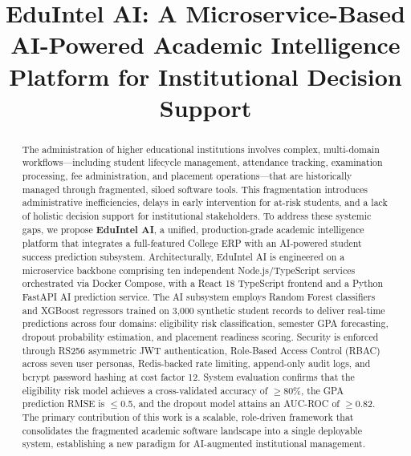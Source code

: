 \documentclass[conference]{IEEEtran}
\begin{document}
\title{EduIntel AI: A Microservice-Based AI-Powered Academic Intelligence Platform for Institutional Decision Support}

\author{
\and
{}
}

\maketitle

\begin{abstract}
The administration of higher educational institutions involves complex,
multi-domain workflows---including student lifecycle management, attendance
tracking, examination processing, fee administration, and placement
operations---that are historically managed through fragmented, siloed software
tools. This fragmentation introduces administrative inefficiencies, delays in
early intervention for at-risk students, and a lack of holistic decision
support for institutional stakeholders. To address these systemic gaps, we
propose \textbf{EduIntel AI}, a unified, production-grade academic intelligence
platform that integrates a full-featured College ERP with an AI-powered student
success prediction subsystem. Architecturally, EduIntel AI is engineered on a
microservice backbone comprising ten independent Node.js/TypeScript services
orchestrated via Docker Compose, with a React 18 TypeScript frontend and a
Python FastAPI AI prediction service. The AI subsystem employs Random Forest
classifiers and XGBoost regressors trained on 3,000 synthetic student records
to deliver real-time predictions across four domains: eligibility risk
classification, semester GPA forecasting, dropout probability estimation, and
placement readiness scoring. Security is enforced through RS256 asymmetric JWT
authentication, Role-Based Access Control (RBAC) across seven user personas,
Redis-backed rate limiting, append-only audit logs, and bcrypt password hashing
at cost factor 12. System evaluation confirms that the eligibility risk model
achieves a cross-validated accuracy of $\geq$80\%, the GPA prediction RMSE is
$\leq$0.5, and the dropout model attains an AUC-ROC of $\geq$0.82. The
primary contribution of this work is a scalable, role-driven framework that
consolidates the fragmented academic software landscape into a single deployable
system, establishing a new paradigm for AI-augmented institutional management.
\end{abstract}
\end{document}
